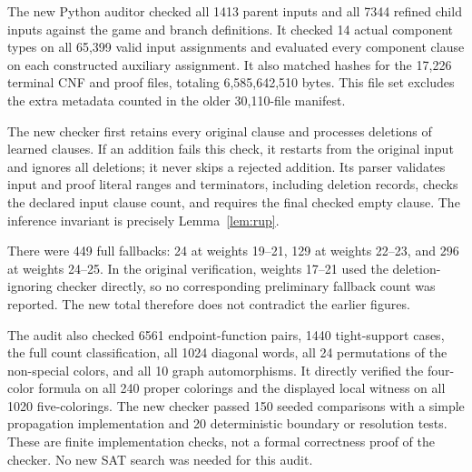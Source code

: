 The new Python auditor checked all 1413 parent inputs and all 7344
refined child inputs against the game and branch definitions. It checked
14 actual component types on all 65,399 valid input assignments and
evaluated every component clause on each constructed auxiliary
assignment. It also matched hashes for the 17,226 terminal CNF and proof
files, totaling 6,585,642,510 bytes. This file set excludes the extra
metadata counted in the older 30,110-file manifest.

\begin{table}[H]
\centering\small
\caption{Complete new replay. A full fallback restarts the proof from
its original input and checks all additions while ignoring deletions.}
\label{tab:fresh-audit}

\end{table}

The new checker first retains every original clause and processes
deletions of learned clauses. If an addition fails this check, it
restarts from the original input and ignores all deletions; it never
skips a rejected addition. Its parser validates input and proof literal
ranges and terminators, including deletion records, checks the declared
input clause count, and requires the final checked empty clause.
The inference invariant is precisely Lemma~\ref{lem:rup}.

There were 449 full fallbacks: 24 at weights 19--21, 129 at weights
22--23, and 296 at weights 24--25. In the original verification,
weights 17--21 used the deletion-ignoring checker directly, so no
corresponding preliminary fallback count was reported. The new total
therefore does not contradict the earlier figures.

The audit also checked 6561 endpoint-function pairs, 1440 tight-support
cases, the full count classification, all 1024 diagonal words, all 24
permutations of the non-special colors, and all 10 graph automorphisms.
It directly verified the four-color formula on all 240 proper colorings
and the displayed local witness on all 1020 five-colorings. The new
checker passed 150 seeded comparisons with a simple propagation
implementation and 20 deterministic boundary or resolution tests.
These are finite implementation checks, not a formal correctness proof
of the checker. No new SAT search was needed for this audit.
